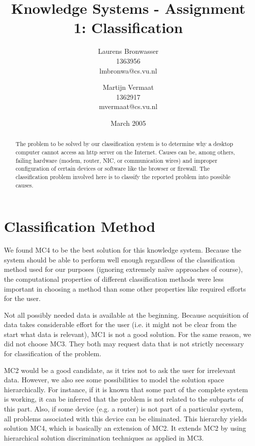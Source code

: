 \documentclass[a4paper,11pt]{article}
\title{Knowledge Systems - Assignment 1: Classification}
\author{Laurens Bronwasser\\
1363956\\
lmbronwa@cs.vu.nl
\and
Martijn Vermaat\\
1362917\\
mvermaat@cs.vu.nl}
\date{March 2005}
\begin{document}
\maketitle


\renewcommand{\abstractname}{Introduction} %
\begin{abstract}
  The problem to be solved by our classification system is to determine why a
  desktop computer cannot access an http server on the Internet. Causes can
  be, among others, failing hardware (modem, router, NIC, or communication
  wires) and improper configuration of certain devices or software like the
  browser or firewall. The classification problem involved here is to
  classify the reported problem into possible causes.
\end{abstract}


\section*{Classification Method}

We found MC4 to be the best solution for this knowledge system. Because the
system should be able to perform well enough regardless of the classification
method used for our purposes (ignoring extremely na\"ive approaches of
course), the computational properties of different classification methods were
less important in choosing a method than some other properties like required
efforts for the user.

Not all possibly needed data is available at the beginning. Because
acquisition of data takes considerable effort for the user (i.e. it might not
be clear from the start what data is relevant), MC1 is not a good
solution. For the same reason, we did not choose MC3. They both may request 
data that is not strictly necessary for classification of the problem.

MC2 would be a good candidate, as it tries not to ask the user for irrelevant
data. However, we also see some possibilities to model the solution space
hierarchically. For instance, if it is known that some part of the complete
system is working, it can be inferred that the problem is not related to the
subparts of this part. Also, if some device (e.g. a router) is not part of a
particular system, all problems associated with this device can be
eliminated. This hierarchy yields solution MC4, which is basically an
extension of MC2. It extends MC2 by using hierarchical solution discrimination
techniques as applied in MC3.
\end{document}
